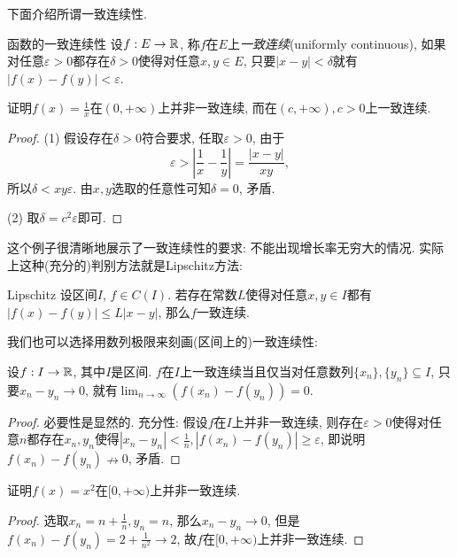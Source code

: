 下面介绍所谓一致连续性. 

\begin{definition}{函数的一致连续性}
	设$f:E \to \mathbb{R}$, 称$f$在$E$上\textit{一致连续}(uniformly continuous), 如果对任意$\varepsilon >0$都存在$\delta >0$使得对任意$x,y \in E$, 只要$|x-y|<\delta$就有$|f(x)-f(y)|<\varepsilon$. 
\end{definition}

\begin{example}
	证明$f(x)=\frac{1}{x}$在$(0,+\infty)$上并非一致连续, 而在$(c ,+\infty ), c >0$上一致连续. 
\end{example}
\begin{proof}
	(1) 假设存在$\delta >0$符合要求, 任取$\varepsilon >0$, 由于$$\varepsilon > |\frac{1}{x}-\frac{1}{y}| = \frac{|x-y|}{xy},$$
	所以$\delta <xy\varepsilon$. 由$x,y$选取的任意性可知$\delta =0$, 矛盾. 
	
	(2) 取$\delta = c^2\varepsilon$即可. 
\end{proof}

这个例子很清晰地展示了一致连续性的要求: 不能出现增长率无穷大的情况. 实际上这种(充分的)判别方法就是Lipschitz方法: 

\begin{proposition}{Lipschitz}
	设区间$I$, $f \in C(I)$. 若存在常数$L$使得对任意$x,y \in I$都有$|f(x)-f(y)| \leq L|x-y|$, 那么$f$一致连续. 
\end{proposition}

我们也可以选择用数列极限来刻画(区间上的)一致连续性: 

\begin{proposition}{}
	设$f:I \to \mathbb{R}$, 其中$I$是区间. $f$在$I$上一致连续当且仅当对任意数列$\{ x_n \},\{ y_n \} \subseteq I$, 只要$x_n- y_n \to 0$, 就有$\lim_{n\to \infty} (f(x_n)-f(y_n))=0$. 
\end{proposition}
\begin{proof}
	必要性是显然的. 充分性: 假设$f$在$I$上并非一致连续, 则存在$\varepsilon >0$使得对任意$n$都存在$x_n,y_n$使得$|x_n-y_n|<\frac{1}{n}, |f(x_n)-f(y_n)| \geq \varepsilon$, 即说明$f(x_n) - f(y_n) \nrightarrow 0$, 矛盾. 
\end{proof}

\begin{example}
	证明$f(x)=x^2$在$[0,+\infty)$上并非一致连续. 
\end{example}
\begin{proof}
	选取$x_n=n+\frac{1}{n},y_n=n$, 那么$x_n-y_n \to 0$, 但是$f(x_n)-f(y_n)=2+\frac{1}{n^2} \to 2$, 故$f$在$[0,+\infty)$上并非一致连续. 
\end{proof}

